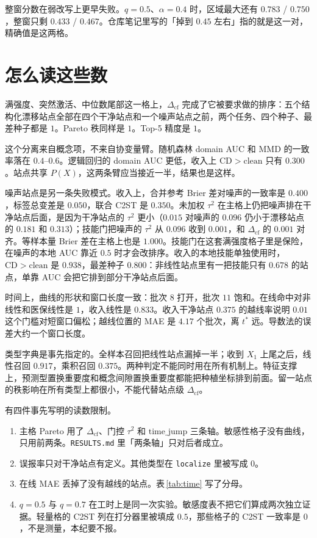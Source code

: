 \documentclass[11pt,a4paper,fontset=none]{ctexart}
\newcommand{\Dcf}{\ensuremath{\Delta_{\mathrm{cf}}}}
\begin{document}
整窗分数在弱改写上更早失败。\(q=0.5\)、\(\alpha=0.4\) 时，区域最大还有 \(0.783\) / \(0.750\)，整窗只剩 \(0.433\) / \(0.467\)。仓库笔记里写的「掉到 \(0.45\) 左右」指的就是这一对，精确值是这两格。

\FloatBarrier
\section{怎么读这些数}
\label{sec:reading}

满强度、突然激活、中位数尾部这一格上，\(\Dcf\) 完成了它被要求做的排序：五个结构化漂移站点全部在四个干净站点和一个噪声站点之前，两个任务、四个种子、最差种子都是 \(1\)。Pareto 秩同样是 \(1\)。Top-5 精度是 \(1\)。

这个分离来自概念项，不来自协变量臂。随机森林 domain AUC 和 MMD 的一致率落在 \(0.4\)--\(0.6\)。逻辑回归的 domain AUC 更低，收入上 \(\mathrm{CD}>\mathrm{clean}\) 只有 \(0.300\)。站点共享 \(P(X)\)，这两条臂应当接近一半，结果也是这样。

噪声站点是另一条失败模式。收入上，合并参考 Brier 差对噪声的一致率是 \(0.400\)，标签总变差是 \(0.050\)，联合 C2ST 是 \(0.350\)。未加权 \(\tau^{2}\) 在主格上仍把噪声排在干净站点后面，是因为干净站点的 \(\tau^{2}\) 更小（\(0.015\) 对噪声的 \(0.096\) 仍小于漂移站点的 \(0.181\) 和 \(0.313\)）；技能门把噪声的 \(\tau^{2}\) 从 \(0.096\) 收到 \(0.001\)，和 \(\Dcf\) 的 \(0.001\) 对齐。等样本量 Brier 差在主格上也是 \(1.000\)。技能门在这套满强度格子里是保险，在噪声的本地 AUC 靠近 \(0.5\) 时才会改排序。收入的本地技能单独使用时，\(\mathrm{CD}>\mathrm{clean}\) 是 \(0.938\)，最差种子 \(0.800\)：非线性站点里有一把技能只有 \(0.678\) 的站点，单靠 AUC 会把它排到部分干净站点后面。

时间上，曲线的形状和窗口长度一致：批次 \(8\) 打开，批次 \(11\) 饱和。在线命中对非线性和医保线性是 \(1\)，收入线性是 \(0.833\)。收入干净站点 \(0.375\) 的越线率说明 \(0.01\) 这个门槛对短窗口偏松；越线位置的 MAE 是 \(4.17\) 个批次，离 \(t^{\ast}\) 远。导数法的误差大约一个窗口长度。

类型字典是事先指定的。全样本召回把线性站点漏掉一半；收到 \(X_1\) 上尾之后，线性召回 \(0.917\)，乘积召回 \(0.375\)。两种判定不能同时用在所有机制上。特征支撑上，预测型置换重要度和概念间隙置换重要度都能把种植坐标排到前面。留一站点的秩影响在所有类型上都很小，不能代替站点级 \(\Dcf\)。

有四件事先写明的读数限制。

\begin{enumerate}
\item 主格 Pareto 用了 \(\Dcf\)、门控 \(\tau^{2}\) 和 \(\mathrm{time\_jump}\) 三条轴。敏感性格子没有曲线，只用前两条。\texttt{RESULTS.md} 里「两条轴」只对后者成立。
\item 误报率只对干净站点有定义。其他类型在 \texttt{localize} 里被写成 \(0\)。
\item 在线 MAE 丢掉了没有越线的站点。表\,\ref{tab:time} 写了分母。
\item \(q=0.5\) 与 \(q=0.7\) 在工时上是同一次实验。敏感度表不把它们算成两次独立证据。轻量格的 C2ST 列在打分器里被填成 \(0.5\)，那些格子的 C2ST 一致率是 \(0\)，不是测量，本纪要不报。
\end{enumerate}
\end{document}
